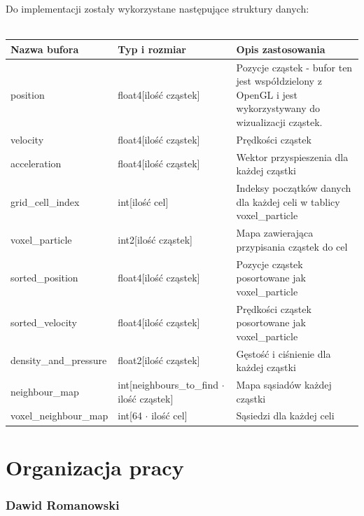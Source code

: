 \documentclass[polish, 12pt]{aghthesis}
\begin{document}
			Do implementacji zostały wykorzystane następujące struktury danych:
			\ \\
			\ \\
			\begin{tabular}{| p{} | p{} | p{} |}
				\hline
					Nazwa bufora & Typ i rozmiar & Opis zastosowania \\
				\hline
					position & float4[ilość cząstek] & Pozycje cząstek - bufor ten jest współdzielony z OpenGL i jest wykorzystywany do wizualizacji cząstek. \\
				\hline
					velocity & float4[ilość cząstek] & Prędkości cząstek \\
				\hline
					acceleration & float4[ilość cząstek] & Wektor przyspieszenia dla każdej cząstki\\
				\hline
					grid\_cell\_index & int[ilość cel] & Indeksy początków danych dla każdej celi w tablicy voxel\_particle \\
				\hline
					voxel\_particle & int2[ilość cząstek] & Mapa zawierająca przypisania cząstek do cel \\ 
				\hline
					sorted\_position & float4[ilość cząstek] & Pozycje cząstek posortowane jak voxel\_particle\\
				\hline
					sorted\_velocity & float4[ilość cząstek] & Prędkości cząstek posortowane jak voxel\_particle\\
				\hline
					density\_and\_pressure & float2[ilość cząstek] & Gęstość i ciśnienie dla każdej cząstki\\
				\hline
					neighbour\_map & int[neighbours\_to\_find ${\cdot}$ ilość cząstek] & Mapa sąsiadów każdej cząstki\\
				\hline
					voxel\_neighbour\_map & int[64 ${\cdot}$ ilość cel] & Sąsiedzi dla każdej celi \\
				\hline
			\end{tabular}



\section{Organizacja pracy}

\subsubsection*{Dawid Romanowski} 
		
\end{document}
